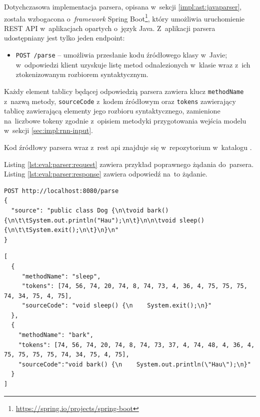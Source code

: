 \documentclass[twoside]{praca}
\begin{document}
Dotychczasowa implementacja parsera, opisana w~sekcji \ref{impl:ast:javaparser}, została wzbogacona o~\textit{framework} Spring Boot\footnote{\url{https://spring.io/projects/spring-boot}}, który umożliwia uruchomienie REST API w~aplikacjach opartych o~język Java. Z~aplikacji parsera udostępniany jest tylko jeden endpoint:

\begin{itemize}
    \item \texttt{POST /parse} -- umożliwia przesłanie kodu źródłowego klasy w~Javie; w~odpowiedzi klient uzyskuje listę metod odnalezionych w~klasie wraz z~ich ztokenizowanym rozbiorem syntaktycznym.
\end{itemize}

Każdy element tablicy będącej odpowiedzią parsera zawiera klucz \texttt{methodName} z~nazwą metody, \texttt{sourceCode} z~kodem źródłowym oraz \texttt{tokens} zawierający tablicę zawierającą elementy jego rozbioru syntaktycznego, zamienione na~liczbowe tokeny zgodnie z~opisiem metodyki przygotowania wejścia modelu w~sekcji \ref{sec:impl:rnn-input}.

Kod źródłowy parsera wraz z~\gls{rest} \gls{api} znajduje się w~repozytorium \cite{fracz:scqm} w~katalogu .

Listing \ref{lst:eval:parser:request} zawiera przykład poprawnego żądania do~parsera. Listing \ref{lst:eval:parser:response} zawiera odpowiedź na~to żądanie.

\begin{lstlisting}[frame=single,caption={Przykład poprawnego żądania do~REST API wystawionego przez aplikację z~parserem},captionpos=b,label={lst:eval:parser:request}]
POST http://localhost:8080/parse
{
  "source": "public class Dog {\n\tvoid bark() {\n\t\tSystem.out.println("Hau");\n\t}\n\n\tvoid sleep() {\n\t\tSystem.exit();\n\t}\n}\n"
}
\end{lstlisting}

\begin{lstlisting}[frame=single,caption={Przykład odpowiedzi z~REST API wystawionego przez aplikację z~parserem},captionpos=b,label={lst:eval:parser:response}]
[
  {
     "methodName": "sleep",
     "tokens": [74, 56, 74, 20, 74, 8, 74, 73, 4, 36, 4, 75, 75, 75, 74, 34, 75, 4, 75],
     "sourceCode": "void sleep() {\n    System.exit();\n}"
  },
  {
    "methodName": "bark",
    "tokens": [74, 56, 74, 20, 74, 8, 74, 73, 37, 4, 74, 48, 4, 36, 4, 75, 75, 75, 75, 74, 34, 75, 4, 75],
    "sourceCode":"void bark() {\n    System.out.println(\"Hau\");\n}"
  }
]
\end{lstlisting}
\end{document}
